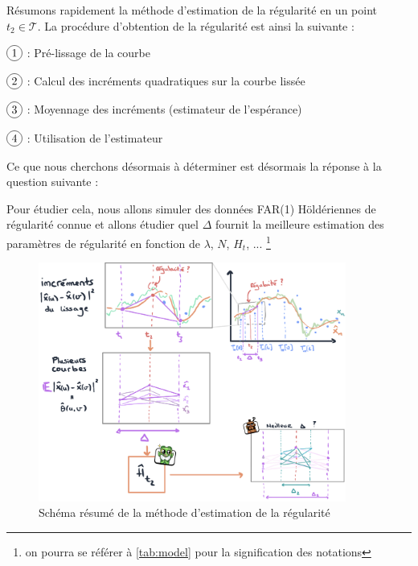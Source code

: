Résumons rapidement la méthode d'estimation de la régularité en un point $t_2 \in \mathcal T$.
\noindent La procédure d'obtention de la régularité est ainsi la suivante :

$\circled 1$ : Pré-lissage de la courbe

$\circled 2$ : Calcul des incréments quadratiques sur la courbe lissée

$\circled 3$ : Moyennage des incréments (estimateur de l'espérance)

$\circled 4$ : Utilisation de l'estimateur

Ce que nous cherchons désormais à déterminer est désormais la réponse à la question suivante :


Pour étudier cela, nous allons simuler des données FAR(1) Höldériennes de régularité connue et allons étudier quel $\Delta$ fournit la meilleure estimation des paramètres de régularité en fonction de $\lambda$, $N$, $H_t$, ... \footnote{on pourra se référer à \ref{tab:model} pour la signification des notations}

\begin{figure}[H]
	\begin{center}
		\includegraphics[width=0.9\textwidth]{Images/sketches/estim_reg.jpg}
	\end{center}

	\caption{Schéma résumé de la méthode d'estimation de la régularité}
	\label{fig:sketch_estim_reg_methodo}
\end{figure}

